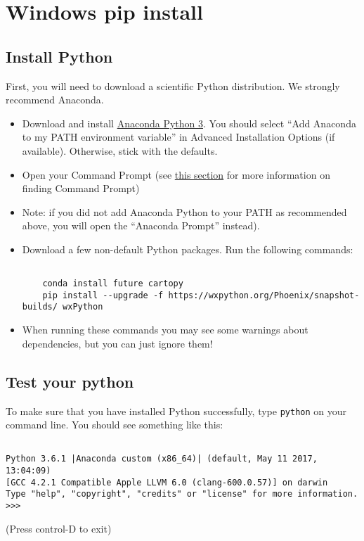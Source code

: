 \documentclass[11pt]{article}
\begin{document}
\tableofcontents

\section{Windows pip install}


\subsection{Install Python}
First, you will need to download a scientific Python distribution.  We strongly recommend Anaconda.

   \begin{itemize}
   \item Download and install \href{https://www.anaconda.com/download}{Anaconda Python 3}.  You should select ``Add Anaconda to my PATH environment variable'' in Advanced Installation Options (if available).  Otherwise, stick with the defaults.
   \item Open your Command Prompt (see \href{https://earthref.org/PmagPy/cookbook/#command_line}{this section} for more information on finding Command Prompt)
   \item Note: if you did not add Anaconda Python to your PATH as recommended above, you will open the ``Anaconda Prompt'' instead).
   \item Download a few non-default Python packages.  Run the following commands: \begin{verbatim}

    conda install future cartopy
    pip install --upgrade -f https://wxpython.org/Phoenix/snapshot-builds/ wxPython
\end{verbatim}
   \item When running these commands you may see some warnings about dependencies, but you can just ignore them!

\end{itemize}


\subsection{Test your python}

To make sure that you have installed Python successfully, type \texttt{python} on your command line.  You should see something like this: \begin{verbatim}

Python 3.6.1 |Anaconda custom (x86_64)| (default, May 11 2017, 13:04:09)
[GCC 4.2.1 Compatible Apple LLVM 6.0 (clang-600.0.57)] on darwin
Type "help", "copyright", "credits" or "license" for more information.
>>>\end{verbatim}
(Press control-D to exit)
\end{document}
